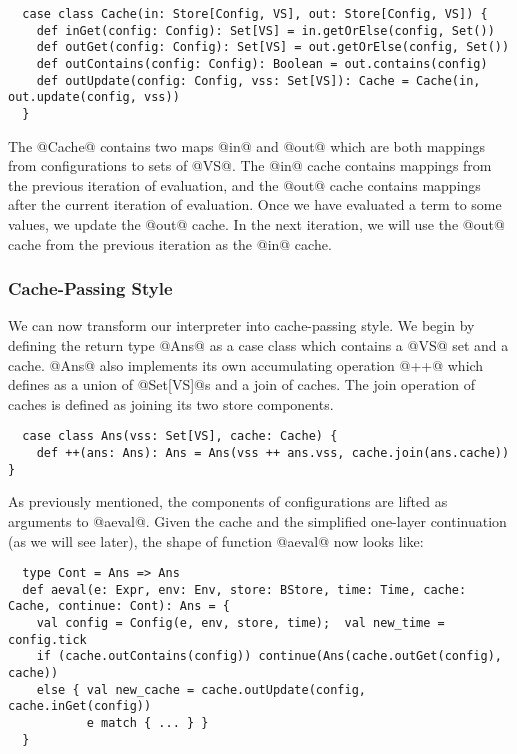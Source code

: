 \documentclass[acmsmall, review]{acmart}\settopmatter{}
\begin{document}
\begin{lstlisting}
  case class Cache(in: Store[Config, VS], out: Store[Config, VS]) {
    def inGet(config: Config): Set[VS] = in.getOrElse(config, Set())
    def outGet(config: Config): Set[VS] = out.getOrElse(config, Set())
    def outContains(config: Config): Boolean = out.contains(config)
    def outUpdate(config: Config, vss: Set[VS]): Cache = Cache(in, out.update(config, vss))
  }
\end{lstlisting}

The @Cache@ contains two maps @in@ and @out@ which are both mappings from configurations 
to sets of @VS@. The @in@ cache contains mappings from the previous iteration of evaluation, 
and the @out@ cache contains mappings after the current iteration of evaluation. 
Once we have evaluated a term to some values, we update the @out@ cache. In the next 
iteration, we will use the @out@ cache from the previous iteration as the @in@ cache. 

\subsubsection{Cache-Passing Style}
We can now transform our interpreter into cache-passing style. We begin by defining the 
return type @Ans@ as a case class which contains a @VS@ set and a cache. @Ans@ also implements 
its own accumulating operation @++@ which defines as a union of @Set[VS]@s and a join of caches.
The join operation of caches is defined as joining its two store components.

\begin{lstlisting}
  case class Ans(vss: Set[VS], cache: Cache) {
    def ++(ans: Ans): Ans = Ans(vss ++ ans.vss, cache.join(ans.cache)) }
\end{lstlisting}

As previously mentioned, the components of configurations are lifted as arguments to
@aeval@. Given the cache and the simplified one-layer continuation (as we will see later), 
the shape of function @aeval@ now looks like:

\begin{lstlisting}
  type Cont = Ans => Ans
  def aeval(e: Expr, env: Env, store: BStore, time: Time, cache: Cache, continue: Cont): Ans = {
    val config = Config(e, env, store, time);  val new_time = config.tick
    if (cache.outContains(config)) continue(Ans(cache.outGet(config), cache))
    else { val new_cache = cache.outUpdate(config, cache.inGet(config))
           e match { ... } }
  }
\end{lstlisting}
\end{document}

